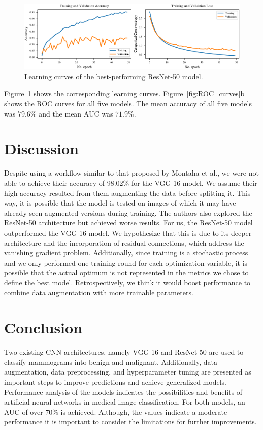 \documentclass[sn-mathphys,Numbered]{sn-jnl}%
\theoremstyle{thmstyleone}%
\theoremstyle{thmstyletwo}%
\theoremstyle{thmstylethree}%
\begin{document}
\begin{figure}[ht]%
\centering
\includegraphics[width=1.0\textwidth]{ResNet50_GlobalAvg_results.pdf}
\caption{Learning curves of the best-performing ResNet-50 model.}
\label{fig:train_val_performance_resnet}
\end{figure}
Figure~\ref{fig:train_val_performance_resnet} shows the corresponding learning curves. Figure~\ref{fig:ROC_curves}b shows the ROC curves for all five models. The mean accuracy of all five models was $79.6\%$ and the mean AUC was $71.9\%$.
\newpage
\section{Discussion}
\label{Discussion}
Despite using a workflow similar to that proposed by Montaha et al., we were not able to achieve their accuracy of 98.02\% for the VGG-16 model. We assume their high accuracy resulted from them augmenting the data before splitting it. This way, it is possible that the model is tested on images of which it may have already seen augmented versions during training. The authors also explored the ResNet-50 architecture but achieved worse results. For us, the ResNet-50 model outperformed the VGG-16 model. We hypothesize that this is due to its deeper architecture and the incorporation of residual connections, which address the vanishing gradient problem. Additionally, since training is a stochastic process and we only performed one training round for each optimization variable, it is possible that the actual optimum is not represented in the metrics we chose to define the best model. Retrospectively, we think it would boost performance to combine data augmentation with more trainable parameters.
\section{Conclusion}
\label{conclusion}
Two existing CNN architectures, namely VGG-16 and ResNet-50 are used to classify mammograms into benign and malignant. Additionally, data augmentation, data preprocessing, and hyperparameter tuning are presented as important steps to improve predictions and achieve generalized models.
Performance analysis of the models indicates the possibilities and benefits of artificial neural networks in medical image classification. For both models, an AUC of over 70\% is achieved. Although, the values indicate a moderate performance it is important to consider the limitations for further improvements.
\end{document}
